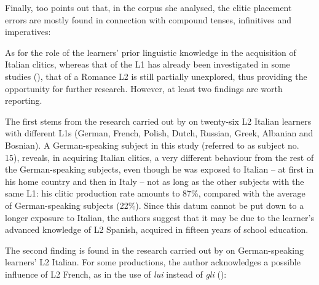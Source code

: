 \documentclass[output=paper,modfonts,nonflat,newtxmath]{langsci/langscibook}
\begin{document}
\z

Finally, \citet[58]{Corino2012} too points out that, in the corpus she analysed, the clitic placement errors are mostly found in connection with compound tenses, infinitives and imperatives:

\z

As for the role of the learners’ prior linguistic knowledge in the acquisition of Italian clitics, whereas that of the L1 has already been investigated in some studies (\citealt{Berretta1986, LeoniniBelletti2004, BennatiMatteini2006, GianniniCancila2006,Giannini2008, Maffei2009}), that of a Romance L2 is still partially unexplored, thus providing the opportunity for further research. However, at least two findings are worth reporting.

The first stems from the research carried out by \citet{LeoniniBelletti2004} on twenty-six L2 Italian learners with different L1s (German, French, Polish, Dutch, Russian, Greek, Albanian and Bosnian). A German-speaking subject in this study (referred to as subject no. 15), reveals, in acquiring Italian clitics, a very different behaviour from the rest of the German-speaking subjects, even though he was exposed to Italian – at first in his home country and then in Italy – not as long as the other subjects with the same L1: his clitic production rate amounts to 87\%, compared with the average of German-speaking subjects (22\%). Since this datum cannot be put down to a longer exposure to Italian, the authors suggest that it may be due to the learner’s advanced knowledge of L2 Spanish, acquired in fifteen years of school education.

The second finding is found in the research carried out by \citet{Corino2012} on German-speaking learners’ L2 Italian. For some productions, the author acknowledges a possible influence of L2 French, as in the use of \textit{lui} instead of \textit{gli} (\citeyear[48]{Corino2012}):
\end{document}
